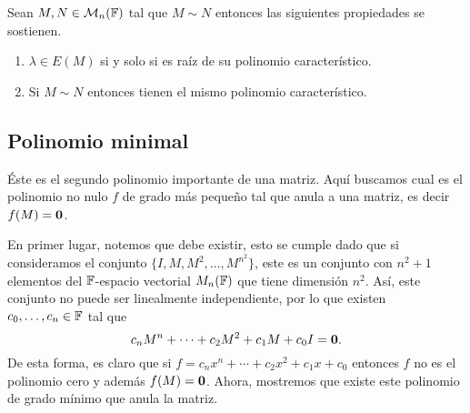 \begin{teor} \label{teor:PropPCaract}
  Sean $M, N \in \mathcal{M}_n(\mathbb{F})$ tal que $M \sim N$ entonces las siguientes propiedades se sostienen.
  \begin{enumerate}
    \item $\lambda \in E(M)$ si y solo si es raíz de su polinomio característico.
    \item Si $M \sim N$ entonces tienen el mismo polinomio característico.
  \end{enumerate}
\end{teor}



\subsection{Polinomio minimal}

Éste es el segundo polinomio importante de una matriz. Aquí buscamos cual es el polinomio no nulo $f$ de grado más pequeño tal que anula a una matriz, es decir $f(M) = \mathbf{0}$.

En primer lugar, notemos que debe existir, esto se cumple dado que si consideramos el conjunto $\{I,M,M^2,\ldots,M^{n^2}\}$, este es un conjunto con $n^2+1$ elementos del $\mathbb{F}$-espacio vectorial $M_n(\mathbb{F})$ que tiene dimensión $n^2$. Así, este conjunto no puede ser linealmente independiente, por lo que existen $c_0,\ldots,c_n\in \mathbb{F}$ tal que 
\[ c_n M^n + \cdots + c_2 M^2 + c_1 M + c_0 I = \mathbf{0}. \]
De esta forma, es claro que si $f = c_n x^n + \cdots + c_2 x^2 + c_1 x + c_0$ entonces $f$ no es el polinomio cero y además $f(M) = \mathbf{0}$. Ahora, mostremos que existe este polinomio de grado mínimo que anula la matriz.

